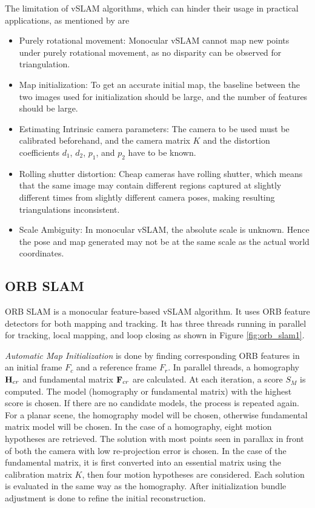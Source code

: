 The limitation of vSLAM algorithms, which can hinder their usage in practical applications, as mentioned by  are

\begin{itemize}
	\item Purely rotational movement: Monocular vSLAM cannot map new points under purely rotational movement, as no disparity can be observed for triangulation.
	\item Map initialization: To get an accurate initial map, the baseline between the two images used for initialization should be large, and the number of features should be large. 
	\item Estimating Intrinsic camera parameters: The camera to be used must be calibrated beforehand, and the  camera matrix $K$ and the distortion coefficients $d_1$, $d_2$, $p_1$, and $p_2$ have to be known.
	\item Rolling shutter distortion: Cheap cameras have rolling shutter, which means that the same image may contain different regions captured at slightly different times from slightly different camera poses, making resulting triangulations inconsistent. 
	\item Scale Ambiguity: In monocular vSLAM, the absolute scale is unknown. Hence the pose and map generated may not be at the same scale as the actual world coordinates.
\end{itemize}




\subsection{ORB SLAM}

ORB SLAM \cite{7219438} is a monocular feature-based vSLAM algorithm. It uses ORB feature detectors for both mapping and tracking. It has three threads running in parallel for tracking, local mapping, and loop closing as shown in Figure \ref{fig:orb_slam1}.

\textit{Automatic Map Initialization} is done by finding corresponding ORB features in an initial frame $F_c$ and a reference frame $F_r$. In parallel threads, a homography ${\bf H}_{cr}$ and fundamental matrix ${\bf F}_{cr}$ are calculated. At each iteration, a score $S_M$ is computed. The model (homography or fundamental matrix) with the highest score is chosen. If there are no candidate models, the process is repeated again. For a planar scene, the homography model will be chosen, otherwise fundamental matrix model will be chosen. In the case of a homography, eight motion hypotheses are retrieved. The solution with most points seen in parallax in front of both the camera with low re-projection error is chosen. In the case of the fundamental matrix, it is first converted into an essential matrix using the calibration matrix $K$, then four motion hypotheses are considered. Each solution is evaluated in the same way as the homography. After initialization bundle adjustment is done to refine the initial reconstruction.

